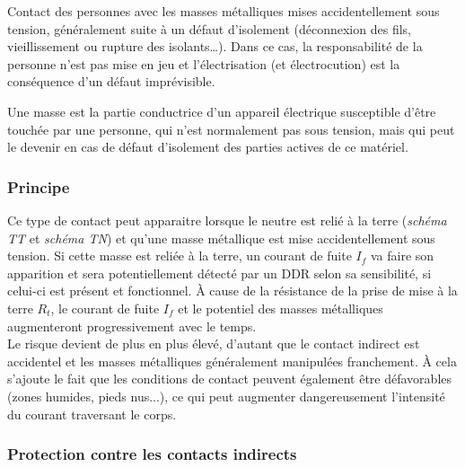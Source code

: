\begin{definition}
Contact des personnes avec les masses métalliques mises accidentellement sous tension, généralement suite à un défaut d'isolement (déconnexion des fils, vieillissement ou rupture des isolants\ldots). Dans ce cas, la responsabilité de la personne n'est pas mise en jeu et l'électrisation (et électrocution) est la conséquence d'un défaut imprévisible.
\end{definition}
\begin{definition}
Une masse est la partie conductrice d'un appareil électrique susceptible d'être touchée par une personne, qui n'est normalement pas sous tension, mais qui peut le devenir en cas de défaut d'isolement des parties actives de ce matériel.
\end{definition}

\subsubsection{Principe}



Ce type de contact peut apparaitre lorsque le neutre est relié à la terre (\emph{schéma TT} et \emph{schéma TN}) et qu'une masse métallique est mise accidentellement sous tension. Si cette masse est reliée à la terre, un courant de fuite $I_f$ va faire son apparition et sera potentiellement détecté par un DDR selon sa sensibilité, si celui-ci est présent et fonctionnel. \`A cause de la résistance de la prise de mise à la terre $R_t$, le courant de fuite $I_f$ et le potentiel des masses métalliques augmenteront progressivement avec le temps.\\

Le risque devient de plus en plus élevé, d'autant que le contact indirect est accidentel et les masses métalliques généralement manipulées franchement. \`A cela s'ajoute le fait que les conditions de contact peuvent également être défavorables (zones humides, pieds nus...), ce qui peut augmenter dangereusement l'intensité du courant traversant le corps.

\subsubsection{Protection contre les contacts indirects}

